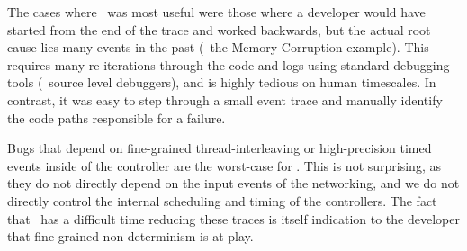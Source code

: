 The cases where \projectname~was most useful were those where a developer would
have started from
the end of the trace and worked backwards, but
the actual root cause lies many events in the past (\eg~the Memory Corruption
example). This requires many re-iterations through the code and logs using standard
debugging tools (\eg~source level debuggers), and
is highly tedious on human timescales. In contrast, it was easy to step
through a small event trace and manually identify the code paths responsible
for a failure.

Bugs that depend on fine-grained thread-interleaving or high-precision timed
events inside of the controller are the worst-case for \projectname. This
is not surprising, as they do not directly depend on the input events of the
networking, and we do not directly control the internal scheduling and timing
of the controllers. The fact that \projectname~has a difficult time reducing
these traces is itself indication to the developer that fine-grained non-determinism is at
play.



%



%

